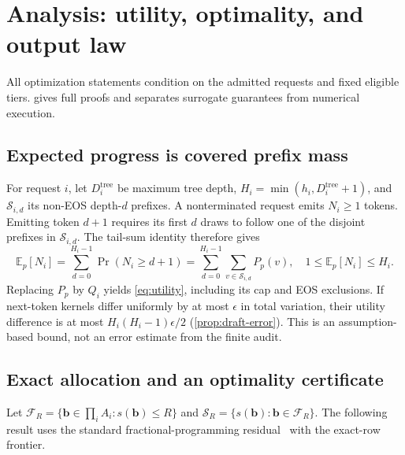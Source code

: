 \documentclass{article}
\begin{document}
\section{Analysis: utility, optimality, and output law}
\label{sec:analysis}
All optimization statements condition on the admitted requests and fixed eligible tiers.  gives full proofs and separates surrogate guarantees from numerical execution.

\subsection{Expected progress is covered prefix mass}
\label{sec:coverage}
For request $i$, let $D_i^{\mathrm{tree}}$ be maximum tree depth, $H_i=\min(h_i,D_i^{\mathrm{tree}}+1)$, and $\mathcal S_{i,d}$ its non-EOS depth-$d$ prefixes. A nonterminated request emits $N_i\ge1$ tokens. Emitting token $d+1$ requires its first $d$ draws to follow one of the disjoint prefixes in $\mathcal S_{i,d}$. The tail-sum identity therefore gives
\begin{equation}
\mathbb E_p[N_i]=\sum_{d=0}^{H_i-1}\Pr(N_i\ge d+1)
=\sum_{d=0}^{H_i-1}\sum_{v\in\mathcal S_{i,d}}P_p(v),
\quad 1\le\mathbb E_p[N_i]\le H_i.
\label{eq:indicator-utility}
\end{equation}
Replacing $P_p$ by $Q_i$ yields \cref{eq:utility}, including its cap and EOS exclusions. If next-token kernels differ uniformly by at most $\epsilon$ in total variation, their utility difference is at most $H_i(H_i-1)\epsilon/2$ (\cref{prop:draft-error}). This is an assumption-based bound, not an error estimate from the finite audit.

\subsection{Exact allocation and an optimality certificate}
\label{sec:optimality}
Let $\mathcal F_R=\{\boldsymbol b\in\prod_i A_i:s(\boldsymbol b)\le R\}$ and $\mathcal S_R=\{s(\boldsymbol b):\boldsymbol b\in\mathcal F_R\}$. The following result uses the standard fractional-programming residual~\citep{dinkelbach1967nonlinear} with the exact-row frontier.
\end{document}
